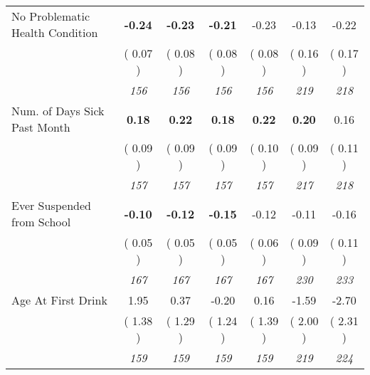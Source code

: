 \begin{tabular}{l c c c c c c}
No Problematic Health Condition & \textbf{     -0.24 } & \textbf{     -0.23 } & \textbf{     -0.21 } &     -0.23 &     -0.13 &     -0.22 \\
& (     0.07 ) & (     0.08 ) & (     0.08 ) & (     0.08 ) & (     0.16 ) & (     0.17 ) \\
& \textit{ 156 } & \textit{ 156 } & \textit{ 156 } & \textit{ 156 } & \textit{ 219 } & \textit{ 218 } \\
Num. of Days Sick Past Month & \textbf{      0.18 } & \textbf{      0.22 } & \textbf{      0.18 } & \textbf{     0.22} & \textbf{      0.20 } &      0.16 \\
& (     0.09 ) & (     0.09 ) & (     0.09 ) & (     0.10 ) & (     0.09 ) & (     0.11 ) \\
& \textit{ 157 } & \textit{ 157 } & \textit{ 157 } & \textit{ 157 } & \textit{ 217 } & \textit{ 218 } \\
Ever Suspended from School & \textbf{     -0.10 } & \textbf{     -0.12 } & \textbf{     -0.15 } &     -0.12 &     -0.11 &     -0.16 \\
& (     0.05 ) & (     0.05 ) & (     0.05 ) & (     0.06 ) & (     0.09 ) & (     0.11 ) \\
& \textit{ 167 } & \textit{ 167 } & \textit{ 167 } & \textit{ 167 } & \textit{ 230 } & \textit{ 233 } \\
Age At First Drink &      1.95 &      0.37 &     -0.20 &      0.16 &     -1.59 &     -2.70 \\
& (     1.38 ) & (     1.29 ) & (     1.24 ) & (     1.39 ) & (     2.00 ) & (     2.31 ) \\
& \textit{ 159 } & \textit{ 159 } & \textit{ 159 } & \textit{ 159 } & \textit{ 219 } & \textit{ 224 } \\
\bottomrule
\end{tabular}
